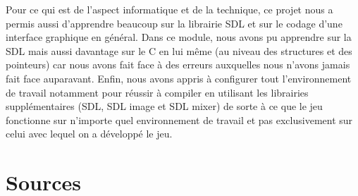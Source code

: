 \documentclass[a4paper,11pt]{article}
\begin{document}
Pour ce qui est de l'aspect informatique et de la technique, ce projet nous a permis aussi d'apprendre beaucoup sur la librairie SDL et sur le codage d'une interface graphique en général. Dans ce module, nous avons pu apprendre sur la SDL mais aussi davantage sur le C en lui même (au niveau des structures et des pointeurs) car nous avons fait face à des erreurs auxquelles nous n'avons jamais fait face auparavant. Enfin, nous avons appris à configurer tout l'environnement de travail notamment pour réussir à compiler en utilisant les librairies supplémentaires (SDL, SDL image et SDL mixer) de sorte à ce que le jeu fonctionne sur n'importe quel environnement de travail et pas exclusivement sur celui avec lequel on a développé le jeu.\\
\newpage
\section{Sources}
\end{document}

